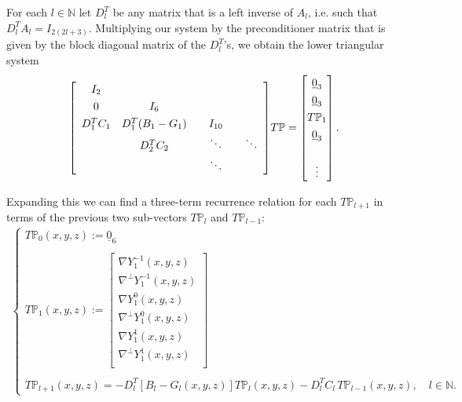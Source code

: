\documentclass[11pt, oneside]{article}   	%
\newcommand{\N}{\mathbb{N}}
\newcommand{\gradP}{T\mathbb{P}}
\newcommand{\gradPl}{T\mathbb{P}_l}
\newcommand{\gradY}{\nabla Y}
\newcommand{\gradpY}{\nabla^\perp Y}
\newcommand{\Dlt}{D^T_l}
\begin{document}
For each \(l \in \N\) let \(\Dlt\) be any matrix that is a left inverse of \(A_l\), i.e. such that \(\Dlt A_l = I_{2(2l+3)}\). Multiplying our system by the preconditioner matrix that is given by the block diagonal matrix of the \(\Dlt\)'s, we obtain the lower triangular system
\begin{align}
\renewcommand\arraystretch{1.3}
\mleft[
\begin{array}{cccc}
		I_2 \\
		0 & I_6 & & \\
		D^T_1 C_1 & D^T_1(B_1-G_1) & \quad I_{10} \quad & \\
		& D^T_2 C_2 & \ddots & \ddots \\
		& & \ddots &
\end{array}
\mright]
\gradP
=
\begin{bmatrix}
	\underline{0}_3 \\ \underline{0}_3 \\ \gradP_1 \\ \underline{0}_3 \\ \\ \vdots \\
\end{bmatrix}.
\end{align}

Expanding this we can find a three-term recurrence relation for each \(\gradP_{l+1}\) in terms of the previous two sub-vectors \(\gradPl\) and \(\gradP_{l-1}\):
\begin{align}
\begin{cases}
\gradP_{0}(x,y,z) := \underline{0}_6 \\
\\
\gradP_{1}(x,y,z) := \begin{bmatrix}
				\gradY_1^{-1}(x,y,z) \\ \gradpY_1^{-1}(x,y,z) \\ \gradY_1^{0}(x,y,z) \\ \gradpY_1^{0}(x,y,z) \\ \gradY_1^{1}(x,y,z) \\ \gradpY_1^{1}(x,y,z) \\
			\end{bmatrix} \\
\\
\gradP_{l+1}(x,y,z) = -\Dlt [B_l-G_l(x,y,z)] \gradPl(x,y,z) - \Dlt C_l  \,\gradP_{l-1}(x,y,z), \quad l \in \N.
\end{cases}
\end{align}
\end{document}
